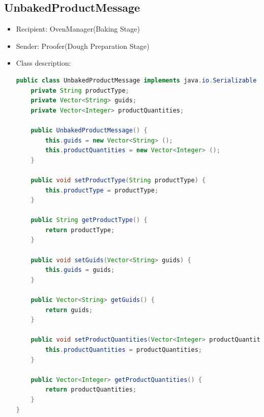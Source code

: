 \documentclass[12pt]{article}
\begin{document}
\subsection{UnbakedProductMessage}
\begin{itemize}
\item Recipient: OvenManager(Baking Stage)
\item Sender: Proofer(Dough Preparation Stage)
\item Class description:
\begin{lstlisting}[language=Java]
public class UnbakedProductMessage implements java.io.Serializable {
    private String productType;
    private Vector<String> guids; 
    private Vector<Integer> productQuantities;
    
	public UnbakedProductMessage() {
        this.guids = new Vector<String> ();
        this.productQuantities = new Vector<Integer> ();
	}

    public void setProductType(String productType) {
        this.productType = productType;
    }

    public String getProductType() {
        return productType;
    }

    public void setGuids(Vector<String> guids) {
        this.guids = guids;
    }

    public Vector<String> getGuids() {
        return guids;
    }

    public void setProductQuantities(Vector<Integer> productQuantities) {
        this.productQuantities = productQuantities;
    }

    public Vector<Integer> getProductQuantities() {
        return productQuantities;
    }
}
\end{lstlisting} 

\end{itemize}
\end{document}
